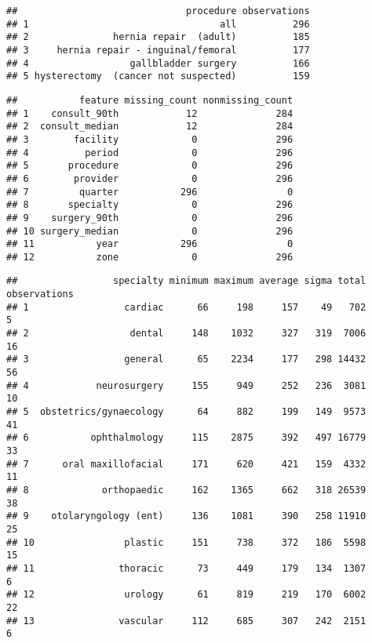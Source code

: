 \documentclass[]{article}
\begin{document}
\begin{verbatim}
##                              procedure observations
## 1                                  all          296
## 2               hernia repair  (adult)          185
## 3     hernia repair - inguinal/femoral          177
## 4                  gallbladder surgery          166
## 5 hysterectomy  (cancer not suspected)          159
\end{verbatim}

\begin{verbatim}
##           feature missing_count nonmissing_count
## 1    consult_90th            12              284
## 2  consult_median            12              284
## 3        facility             0              296
## 4          period             0              296
## 5       procedure             0              296
## 6        provider             0              296
## 7         quarter           296                0
## 8       specialty             0              296
## 9    surgery_90th             0              296
## 10 surgery_median             0              296
## 11           year           296                0
## 12           zone             0              296
\end{verbatim}

\begin{verbatim}
##                 specialty minimum maximum average sigma total observations
## 1                 cardiac      66     198     157    49   702            5
## 2                  dental     148    1032     327   319  7006           16
## 3                 general      65    2234     177   298 14432           56
## 4            neurosurgery     155     949     252   236  3081           10
## 5  obstetrics/gynaecology      64     882     199   149  9573           41
## 6           ophthalmology     115    2875     392   497 16779           33
## 7      oral maxillofacial     171     620     421   159  4332           11
## 8             orthopaedic     162    1365     662   318 26539           38
## 9    otolaryngology (ent)     136    1081     390   258 11910           25
## 10                plastic     151     738     372   186  5598           15
## 11               thoracic      73     449     179   134  1307            6
## 12                urology      61     819     219   170  6002           22
## 13               vascular     112     685     307   242  2151            6
\end{verbatim}
\end{document}
